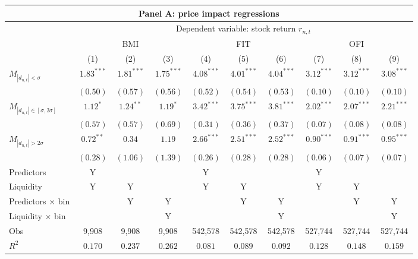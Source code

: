 \begin{tabular}{lccccccccc}
  \hline \multicolumn{10}{c}{Panel A: price impact regressions} \\
 \hline 
                                    & \multicolumn{9}{c}{Dependent variable: stock return $r_{n,t}$} \\

                                    \cmidrule(l){2-10} & \multicolumn{3}{c}{BMI} & \multicolumn{3}{c}{FIT} & \multicolumn{3}{c}{OFI} \\
 \cmidrule(l){2-4} \cmidrule(l){5-7} \cmidrule(l){8-10} 
  & (1) & (2) & (3) & (4) & (5) & (6) & (7) & (8) & (9) \\ 
  $M_{|d_{n,t}| < \sigma}$ & $1.83^{***}$ & $1.81^{***}$ & $1.75^{***}$ & $4.08^{***}$ & $4.01^{***}$ & $4.04^{***}$ & $3.12^{***}$ & $3.12^{***}$ & $3.08^{***}$ \\ 
   & $(0.50)$ & $(0.57)$ & $(0.56)$ & $(0.52)$ & $(0.54)$ & $(0.53)$ & $(0.10)$ & $(0.10)$ & $(0.10)$ \\ 
  $M_{|d_{n,t}| \in [\sigma, 2\sigma]}$ & $1.12^{*}$ & $1.24^{**}$ & $1.19^{*}$ & $3.42^{***}$ & $3.75^{***}$ & $3.81^{***}$ & $2.02^{***}$ & $2.07^{***}$ & $2.21^{***}$ \\ 
   & $(0.57)$ & $(0.57)$ & $(0.69)$ & $(0.31)$ & $(0.36)$ & $(0.37)$ & $(0.07)$ & $(0.08)$ & $(0.08)$ \\ 
  $M_{|d_{n,t}| > 2 \sigma}$ & $0.72^{**}$ & $0.34$ & $1.19$ & $2.66^{***}$ & $2.51^{***}$ & $2.52^{***}$ & $0.90^{***}$ & $0.91^{***}$ & $0.95^{***}$ \\ 
   \vspace{5pt} & $(0.28)$ & $(1.06)$ & $(1.39)$ & $(0.26)$ & $(0.28)$ & $(0.28)$ & $(0.06)$ & $(0.07)$ & $(0.07)$ \\ 
  Predictors & Y &  &  & Y &  &  & Y &  &  \\ 
  Liquidity & Y & Y &  & Y & Y &  & Y & Y &  \\ 
  Predictors $\times$ bin &  & Y & Y &  & Y & Y &  & Y & Y \\ 
   \vspace{5pt}Liquidity $\times$ bin &  &  & Y &  &  & Y &  &  & Y \\ 
  Obs & 9,908 & 9,908 & 9,908 & 542,578 & 542,578 & 542,578 & 527,744 & 527,744 & 527,744 \\ 
  $R^2$ & $0.170$ & $0.237$ & $0.262$ & $0.081$ & $0.089$ & $0.092$ & $0.128$ & $0.148$ & $0.159$ \\ 

\end{tabular}
